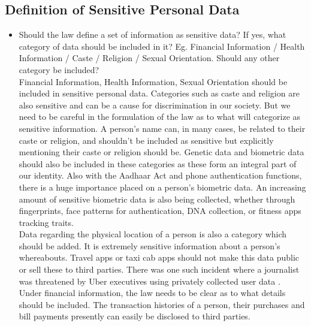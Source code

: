 \subsection{Definition of Sensitive Personal Data}
\begin{itemize}
	\item Should the law define a set of information as sensitive data? If yes, what category of data should be included in it? Eg. Financial Information / Health Information / Caste / Religion / Sexual Orientation. Should any other category be included?
	\\
	Financial Information, Health Information, Sexual Orientation should be included in sensitive personal data. Categories such as caste and religion are also sensitive and can be a cause for discrimination in our society. But we need to be careful in the formulation of the law as to what will categorize as sensitive information. A person's name can, in many cases, be related to their caste or religion, and shouldn't be included as sensitive but explicitly mentioning their caste or religion should be. Genetic data and biometric data should also be included in these categories as these form an integral part of our identity. Also with the Aadhaar Act and phone authentication functions, there is a huge importance placed on a person's biometric data. An increasing amount of sensitive biometric data is also being collected, whether through fingerprints, face patterns for authentication, DNA collection, or fitness apps tracking traits.
	\\
	Data regarding the physical location of a person is also a category which should be added. It is extremely sensitive information about a person's whereabouts. Travel apps or taxi cab apps should not make this data public or sell these to third parties. There was one such incident where a journalist was threatened by Uber executives using privately collected user data \cite{ubersmear}.
	\\
	Under financial information, the law needs to be clear as to what details should be included. The transaction histories of a person, their purchases and bill payments presently can easily be disclosed to third parties. 
\end{itemize}
